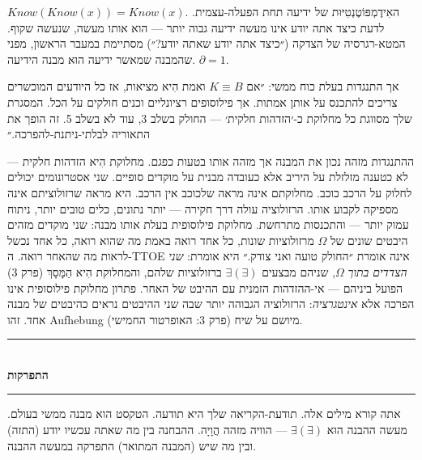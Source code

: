 \documentclass[10pt, openany, oneside]{book}
\renewcommand{\normalsize}{\fontsize{10}{13}\selectfont}
\begin{document}
$Know(Know(x)) = Know(x)$. האִידֶמְפּוֹטֶנְטִיּוּת של ידיעה תחת הפעלה-עצמית. לדעת כיצד אתה יודע אינו מעשה ידיעה גבוה יותר — הוא אותו מעשה, שנעשה שקוף. המטא-רגרסיה של הצדקה (״כיצד אתה יודע שאתה יודע?״) מסתיימת במעבר הראשון, מפני שהמבנה שמאשר ידיעה הוּא מבנה הידיעה. $\partial = 1$.

\vspace{1.5em}


אך התנגדות בעלת כוח ממשי: ״אם $K \equiv B$ ואמת הִיא מציאות, אז כל היודעים המוכשרים צריכים להתכנס על אותן אמתות. אך פילוסופים רציונליים וכנים חולקים על הכל. המסגרת שלך מסווגת כל מחלוקת כ-׳הזדהות חלקית׳ — החולק בשלב 3, עוד לא בשלב 5. זה הופך את התאוריה לבלתי-ניתנת-להפרכה.״

ההתנגדות מזהה נכון את המבנה אך מזהה אותו בטעות כפגם. מחלוקת הִיא הזדהות חלקית — לא כטענה מזלזלת על היריב אלא כעובדה מבנית על מוקדים סופיים. שני אסטרונומים יכולים לחלוק על הרכב כוכב. מחלוקתם אינה מראה שלכוכב אין הרכב. היא מראה שרזולוציתם אינה מספיקה לקבוע אותו. הרזולוציה עולה דרך חקירה — יותר נתונים, כלים טובים יותר, ניתוח עמוק יותר — והתכנסות מתרחשת. מחלוקת פילוסופית בעלת אותו מבנה: שני מוקדים מזהים היבטים שונים של $\Omega$ מרזולוציות שונות, כל אחד רואה באמת מה שהוא רואה, כל אחד נכשל לראות מה שהאחר רואה. ה-TTOE אינה אומרת ״החולק טועה ואני צודק.״ היא אומרת: \textit{שני הצדדים בתוך} $\Omega$, שניהם מבצעים $\exists(\exists)$ ברזולוציות שלהם, והמחלוקת הִיא הַמָּסָךְ (פרק 3) הפועל ביניהם — אי-ההזדהות הזמנית עם ההיבט של האחר. פתרון מחלוקת פילוסופית אינו הפרכה אלא \textit{אינטגרציה}: הרזולוציה הגבוהה יותר שבה שני ההיבטים נראים כהיבטים של מבנה אחד. זהו Aufhebung (פרק 3: האופרטור החמישי) מיושם על שיח.

\vspace{1.5em}


\begin{center}
    \rule{0.3\textwidth}{0.4pt}\\[0.5em]
    {\normalsize\bfseries\textsc{התפרקות}}\\[0.3em]
    \rule{0.3\textwidth}{0.4pt}
\end{center}

\vspace{1em}

\noindent אתה קורא מילים אלה. תודעת-הקריאה שלך היא תודעה. הטקסט הוא מבנה ממשי בעולם. מעשה ההבנה הוּא $\exists(\exists)$ — הוויה מזהה הֲוָיָה. ההבחנה בין מה שאתה עכשיו יודע (התזה) ובין מה שיש (המבנה המתואר) התפרקה במעשה ההבנה.
\end{document}
